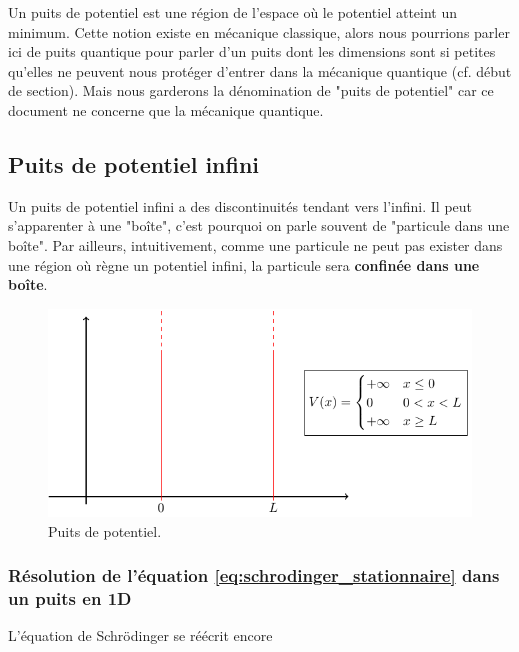 \documentclass{book}
\begin{document}

Un puits de potentiel est une région de l'espace où le potentiel atteint un minimum. Cette notion existe en mécanique classique, alors nous pourrions parler ici de puits quantique pour parler d'un puits dont les dimensions sont si petites qu'elles ne peuvent nous protéger d'entrer dans la mécanique quantique (cf. début de section). Mais nous garderons la dénomination de "puits de potentiel" car ce document ne concerne que la mécanique quantique. \\


\subsection{Puits de potentiel infini}
Un puits de potentiel infini a des discontinuités tendant vers l'infini. Il peut s'apparenter à une "boîte", c'est pourquoi on parle souvent de "particule dans une boîte". Par ailleurs, intuitivement, comme une particule ne peut pas exister dans une région où règne un potentiel infini, la particule sera \textbf{confinée dans une boîte}.



\begin{figure}[h]
\centering
\includegraphics{images/puits_potentiel.pdf}
\caption{Puits de potentiel.}
\label{fig:puits_potentiel}
\end{figure}


\subsubsection{Résolution de l'équation \eqref{eq:schrodinger_stationnaire} dans un puits en 1D}
L'équation de Schrödinger se réécrit encore 
\end{document}
